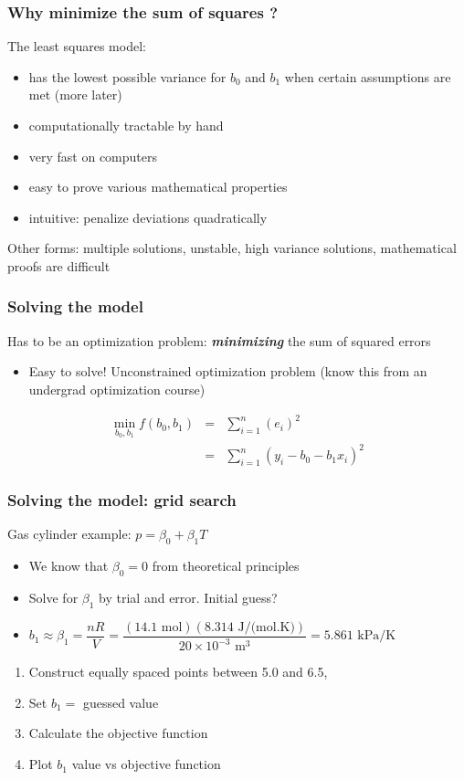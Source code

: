 \begin{frame}\frametitle{Why minimize the sum of squares ?}

	The least squares model:
	\begin{itemize}
		\item	has the lowest possible variance for $b_0$ and $b_1$ when certain assumptions are met (more later)
		\item	computationally tractable by hand
		\item	very fast on computers
		\item	easy to prove various mathematical properties
		\item	intuitive: penalize deviations quadratically
	\end{itemize}

	Other forms: multiple solutions, unstable, high variance solutions, mathematical proofs are difficult
\end{frame}

\begin{frame}\frametitle{Solving the model}

	Has to be an optimization problem: \textbf{\emph{minimizing}} the sum of squared errors
	\begin{itemize}
		\item	Easy to solve! Unconstrained optimization problem (know this from an undergrad optimization course)
	\end{itemize}

	$$
	\begin{array}{rcl}
		\min_{\displaystyle b_0, b_1} f(b_0, b_1) &=& \sum_{i=1}^{n}{(e_i)^2} \\
		&=& \sum_{i=1}^{n}{\left(y_i - b_0 - b_1 x_i\right)^2}
	\end{array}
	$$
\end{frame}

\begin{frame}\frametitle{Solving the model: grid search}

	Gas cylinder example: $p = \beta_0 + \beta_1 T$
	\begin{itemize}
		\item	We know that $\beta_0 = 0$ from theoretical principles
		\item	Solve for $\beta_1$ by trial and error. Initial guess?
		\item	$b_1 \approx \beta_1 = \dfrac{nR}{V} = \dfrac{(14.1 \,\, \text{mol})(8.314 \,\,\text{J/(mol.K)})}{20 \times 10^{-3} \,\,\text{m}^3} = 5.861 \,\,\text{kPa/K}$
	\end{itemize}
	\begin{enumerate}
		\item	Construct equally spaced points between 5.0 and 6.5,
		\item	Set $b_1 = $ guessed value
		\item	Calculate the objective function
		\item	Plot $b_1$ value vs objective function
	\end{enumerate}
\end{frame}

